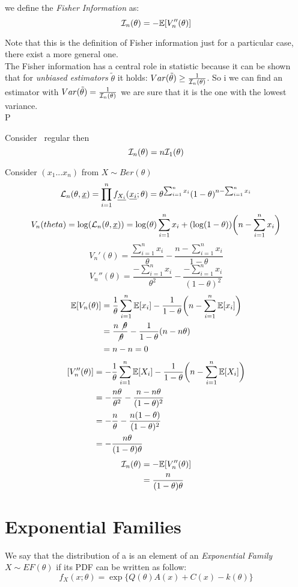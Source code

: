 \begin{defi}
	we define the \textit{Fisher Information} as:
	$$\mathcal{I}_n(\theta)=-\mathbb{E}[V_n''(\theta)]$$
\end{defi}
Note that this is the definition of Fisher information just for a particular case, there exist a more general one.\\
The Fisher information has a central role in statistic because it can be shown that for \textit{unbiased estimators} $\tilde \theta$ it holds: $Var(\tilde \theta)\geq \frac{1}{\mathcal{I}_n(\theta)}$. So i we can find an estimator with  $Var(\tilde \theta)= \frac{1}{\mathcal{I}_n(\theta)}$ we are sure that it is the one with the lowest variance.\\
P\begin{prop}
	Consider \rsf \  regular then
	$$\mathcal{I}_n(\theta)=n\mathcal{I}_1(\theta)$$
\end{prop}
\begin{eg}
	Consider $(x_1...x_n)$ from $X\sim Ber(\theta)$
	$$\mathcal{L}_n(\theta,\underline x) = \prod_{i=1}^{n} f_{\underline{X_i}}(\underline{x_i};\theta)=\theta^{\sum_{i=1}^{n}x_i}(1-\theta)^{n-\sum_{i=1}^{n}x_i}$$
	$$V_n(theta)=\log(\mathcal{L}_n(\theta,\underline x))=\log(\theta)\sum_{i=1}^{n}x_i+(\log(1-\theta))\bigg(n-\sum_{i=1}^{n}x_i\bigg)$$
	$$V_n'(\theta)=\frac{\sum_{i=1}^{n}x_i}{\theta}-\frac{n- \sum_{i=1}^{n}x_i}{1-\theta}$$
	$$V_n''(\theta)=\frac{-\sum_{i=1}^{n}x_i}{\theta^2}-\frac{-\sum_{i=1}^{n}x_i}{(1-\theta)^2}$$
	\[
	\begin{split}
	\mathbb{E}[V_n(\theta)]
	&	=\frac{1}{\theta}\sum_{i=1}^{n}\mathbb{E}[x_i]-\frac{1}{1-\theta}\bigg( n- \sum_{i=1}^{n}\mathbb{E}[x_i]\bigg)\\
	&=\frac{n\not \theta}{\not \theta}-\frac{1}{1-\theta}(n-n\theta)\\
	&=n-n=0
	\end{split}
	\]
	\[
	\begin{split}
		[V_n''(\theta)]
		&=-\frac{1}{\theta}\sum_{i=1}^{n}\mathbb{E}[X_i]-\frac{1}{1-\theta}\bigg( n- \sum_{i=1}^{n}\mathbb{E}[X_i] \bigg)\\
		&=-\frac{n\theta}{\theta^2}-\frac{n-n\theta}{(1-\theta)^2}\\
		&=-\frac{n}{\theta}-\frac{n(1-\theta)}{(1-\theta)^2}\\
		&=-\frac{n\theta}{(1-\theta)\theta}
	\end{split}
	\]
	\[
	\begin{split}
	\mathcal{I}_n(\theta)
	&=-\mathbb{E}[V_n''(\theta)]\\
	&=\frac{n}{(1-\theta)\theta}
	\end{split}
	\]
\end{eg}

\section{Exponential Families}
\begin{defi}
	We say that the distribution of a \rv is an element of an \textit{Exponential Family}	$X\sim EF(\theta)$ if its PDF can be written as follow:
	$$f_X(x;\theta)=\exp \{ Q(\theta)A(x)+ C(x) -k(\theta) \}$$
\end{defi}

